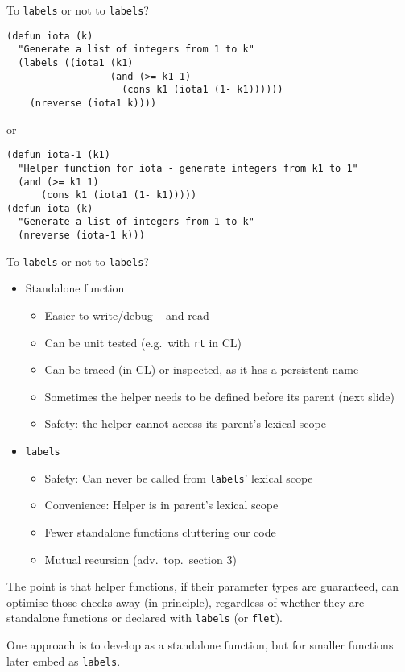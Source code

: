 \documentclass[presentation]{beamer}
\begin{document}
\begin{frame}[fragile]{To \texttt{labels} or not to \texttt{labels}?}
\begin{verbatim}
(defun iota (k)
  "Generate a list of integers from 1 to k"
  (labels ((iota1 (k1)
                  (and (>= k1 1)
                    (cons k1 (iota1 (1- k1))))))
    (nreverse (iota1 k))))
\end{verbatim}
or
\begin{verbatim}
(defun iota-1 (k1)
  "Helper function for iota - generate integers from k1 to 1"
  (and (>= k1 1)
      (cons k1 (iota1 (1- k1)))))
(defun iota (k)
  "Generate a list of integers from 1 to k"
  (nreverse (iota-1 k)))
\end{verbatim}

\end{frame}
\begin{frame}{To \texttt{labels} or not to \texttt{labels}?}
  \begin{itemize}
  \item Standalone function
    \begin{itemize}
    \item Easier to write/debug -- and read
    \item Can be unit tested (e.g.\ with \texttt{rt} in CL)
    \item Can be traced (in CL) or inspected, as it has a persistent name
    \item Sometimes the helper needs to be defined before its parent (next slide)
    \item Safety: the helper cannot access its parent's lexical scope
    \end{itemize}
  \item \texttt{labels}
    \begin{itemize}
    \item Safety: Can never be called from \texttt{labels}' lexical scope
    \item Convenience: Helper is in parent's lexical scope
    \item Fewer standalone functions cluttering our code
    \item Mutual recursion (adv.\ top.\ section 3)
    \end{itemize}
  \end{itemize}
  The point is that helper functions, if their parameter types are guaranteed, can optimise those checks away (in principle), regardless of whether they are standalone functions or declared with \texttt{labels} (or \texttt{flet}).

  \medskip
  One approach is to develop as a standalone function, but for smaller functions later embed as \texttt{labels}.
\end{frame}
\end{document}
